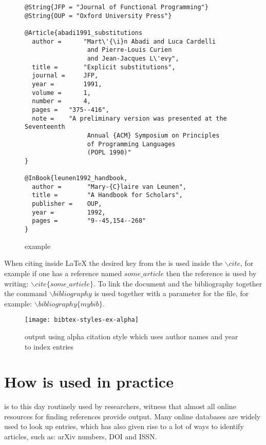 \begin{figure}
  \centering
  \begin{small}
\begin{verbatim}
@String{JFP = "Journal of Functional Programming"}
@String{OUP = "Oxford University Press"}

@Article{abadi1991_substitutions
  author =      "Mart\'{\i}n Abadi and Luca Cardelli
                 and Pierre-Louis Curien
                 and Jean-Jacques L\'evy",
  title =       "Explicit substitutions",
  journal =     JFP,
  year =        1991,
  volume =      1,
  number =      4,
  pages =	"375--416",
  note =	"A preliminary version was presented at the Seventeenth
                 Annual {ACM} Symposium on Principles
                 of Programming Languages
                 (POPL 1990)"
}

@InBook{leunen1992_handbook,
  author =       "Mary-{C}laire van Leunen",
  title =        "A Handbook for Scholars",
  publisher =    OUP,
  year =         1992,
  pages =        "9--45,154--268"
}
\end{verbatim}
  \end{small}
  \caption{{\bibtex} example}
\label{fig:bibtex_example}
\end{figure}

When citing inside {\LaTeX} the desired key from the {\bibtex} is used
inside the ${\backslash}cite$, for example if one has a reference
named $some\_article$ then the reference is used by writing:
${\backslash}cite\{some\_article\}$.  To link the document and the
bibliography together the command ${\backslash}bibliography$ is used
together with a parameter for the {\bibtex} file, for example:
${\backslash}bibliography\{mybib\}$.

\begin{figure}
  \centering
  \texttt{[image: bibtex-styles-ex-alpha]}
  \caption{{\bibtex} output using alpha citation style which uses
    author names and year to index entries}
\label{fig:bibtex_example_alpha}
\end{figure}


\section{How {\bibtex} is used in practice}
\label{sec:how_bibtex_is_used_today}

{\bibtex} is to this day routinely used by researchers, witness that
almost all online resources for finding references provide {\bibtex}
output.  Many online databases are widely used to look up entries,
which has also given rise to a lot of ways to identify articles, such
as: arXiv numbers, DOI and ISSN.

